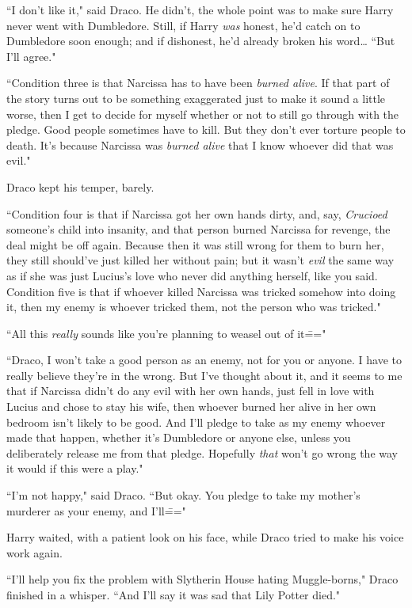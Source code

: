 ``I don't like it," said Draco. He didn't, the whole point was to make sure Harry never went with Dumbledore. Still, if Harry \emph{was} honest, he'd catch on to Dumbledore soon enough; and if dishonest, he'd already broken his word{\ldots} ``But I'll agree."

``Condition three is that Narcissa has to have been \emph{burned alive}. If that part of the story turns out to be something exaggerated just to make it sound a little worse, then I get to decide for myself whether or not to still go through with the pledge. Good people sometimes have to kill. But they don't ever torture people to death. It's because Narcissa was \emph{burned alive} that I know whoever did that was evil."

Draco kept his temper, barely.

``Condition four is that if Narcissa got her own hands dirty, and, say, \emph{Crucioed} someone's child into insanity, and that person burned Narcissa for revenge, the deal might be off again. Because then it was still wrong for them to burn her, they still should've just killed her without pain; but it wasn't \emph{evil} the same way as if she was just Lucius's love who never did anything herself, like you said. Condition five is that if whoever killed Narcissa was tricked somehow into doing it, then my enemy is whoever tricked them, not the person who was tricked."

``All this \emph{really} sounds like you're planning to weasel out of it\==="

``Draco, I won't take a good person as an enemy, not for you or anyone. I have to really believe they're in the wrong. But I've thought about it, and it seems to me that if Narcissa didn't do any evil with her own hands, just fell in love with Lucius and chose to stay his wife, then whoever burned her alive in her own bedroom isn't likely to be good. And I'll pledge to take as my enemy whoever made that happen, whether it's Dumbledore or anyone else, unless you deliberately release me from that pledge. Hopefully \emph{that} won't go wrong the way it would if this were a play."

``I'm not happy," said Draco. ``But okay. You pledge to take my mother's murderer as your enemy, and I'll\==="

Harry waited, with a patient look on his face, while Draco tried to make his voice work again.

``I'll help you fix the problem with Slytherin House hating Muggle-borns," Draco finished in a whisper. ``And I'll say it was sad that Lily Potter died."


